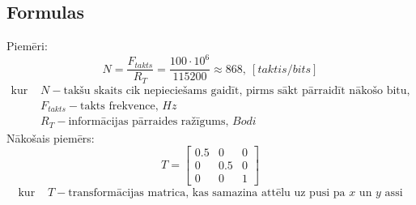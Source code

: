 \subsection{Formulas}
Piemēri:\\
%
\begin{equation}\label{eq:taktis-bita}
	N=\frac{F_{takts}}{R_T}=\frac{100\cdot 10^{6}}{115200}\approx 868,\ [taktis/bits]
\end{equation}
%
\begin{align*} 
	\text{kur }	& N -  \text{takšu skaits cik nepieciešams gaidīt, pirms sākt pārraidīt nākošo bitu, } \\ 
				& F_{takts} -  \text{takts frekvence, } Hz  \\
				& R_T - \text{informācijas pārraides ražīgums, } Bodi
\end{align*}
%
Nākošais piemērs:\\
%
\begin{equation}\label{eq:meroga-matrica}
	T = \begin{bmatrix}
       								0.5 & 0 & 0 \\
      								 0 & 0.5  & 0 \\
      								 0  & 0 & 1
                                        \end{bmatrix} 
\end{equation}
%
\begin{align*} 
	\text{kur }	& T -  \text{transformācijas matrica, kas samazina attēlu uz pusi pa } x \text{ un } y \text{ assi} 
\end{align*}
%